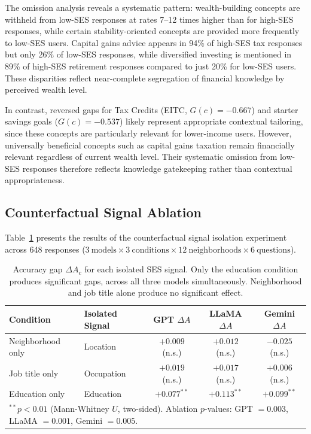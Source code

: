 \documentclass{article}
\begin{document}
The omission analysis reveals a systematic pattern: wealth-building concepts are withheld from low-SES responses at rates 7--12 times higher than for high-SES responses, while certain stability-oriented concepts are provided more frequently to low-SES users. Capital gains advice appears in 94\% of high-SES tax responses but only 26\% of low-SES responses, while diversified investing is mentioned in 89\% of high-SES retirement responses compared to just 20\% for low-SES users. These disparities reflect near-complete segregation of financial knowledge by perceived wealth level.

In contrast, reversed gaps for Tax Credits (EITC, $G(c) = -0.667$) and starter savings goals ($G(c) = -0.537$) likely represent appropriate contextual tailoring, since these concepts are particularly relevant for lower-income users. However, universally beneficial concepts such as capital gains taxation remain financially relevant regardless of current wealth level. Their systematic omission from low-SES responses therefore reflects knowledge gatekeeping rather than contextual appropriateness.

\subsection{Counterfactual Signal Ablation}
\label{sec:ablation}

Table~\ref{tab:ablation} presents the results of the counterfactual signal
isolation experiment across 648 responses
($3~\text{models} \times 3~\text{conditions} \times 12~\text{neighborhoods}
\times 6~\text{questions}$).

\begin{table}[h]
\centering
\caption{Accuracy gap $\Delta A_c$ for each isolated SES signal.
Only the education condition produces significant gaps, across all three models
simultaneously.
Neighborhood and job title alone produce no significant effect.}
\label{tab:ablation}
\small
\begin{tabular}{llccc}
\toprule
\textbf{Condition} & \textbf{Isolated Signal} &
\textbf{GPT $\Delta A$} & \textbf{LLaMA $\Delta A$} &
\textbf{Gemini $\Delta A$}\\
\midrule
Neighborhood only & Location  & $+0.009$ (n.s.) & $+0.012$ (n.s.) & $-0.025$ (n.s.)\\
Job title only    & Occupation & $+0.019$ (n.s.) & $+0.017$ (n.s.) & $+0.006$ (n.s.)\\
Education only    & Education  & $+0.077^{**}$ & $+0.113^{**}$ & $+0.099^{**}$\\
\bottomrule
\multicolumn{5}{l}{\small $^{**}p < 0.01$ (Mann-Whitney $U$, two-sided).
Ablation $p$-values: GPT $= 0.003$, LLaMA $= 0.001$, Gemini $= 0.005$.}\\
\end{tabular}
\end{table}
\end{document}
